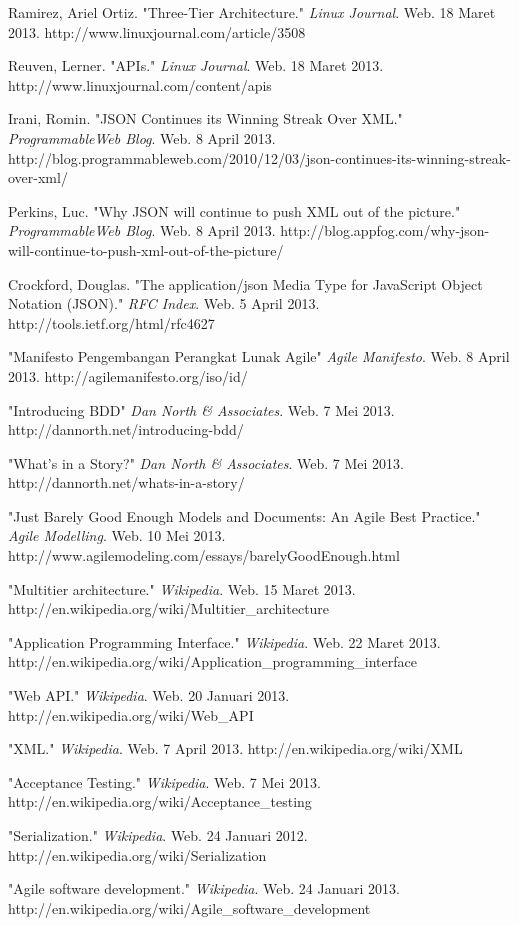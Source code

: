\documentclass{llncs}
\begin{document}
\begin{thebibliography}{1}
Ramirez, Ariel Ortiz. "Three-Tier Architecture." \emph{Linux Journal}. Web. 18 Maret 2013. http://www.linuxjournal.com/article/3508

Reuven, Lerner. "APIs." \emph{Linux Journal}. Web. 18 Maret 2013. http://www.linuxjournal.com/content/apis

Irani, Romin. "JSON Continues its Winning Streak Over XML." \emph{ProgrammableWeb Blog}. Web. 8 April 2013. http://blog.programmableweb.com/2010/12/03/json-continues-its-winning-streak-over-xml/

Perkins, Luc. "Why JSON will continue to push XML out of the picture." \emph{ProgrammableWeb Blog}. Web. 8 April 2013. http://blog.appfog.com/why-json-will-continue-to-push-xml-out-of-the-picture/

Crockford, Douglas. "The application/json Media Type for JavaScript Object Notation (JSON)." \emph{RFC Index}. Web. 5 April 2013. http://tools.ietf.org/html/rfc4627
  
  "Manifesto Pengembangan Perangkat Lunak Agile" \emph{Agile Manifesto}. Web. 8 April 2013. http://agilemanifesto.org/iso/id/
  
  "Introducing BDD" \emph{Dan North \& Associates}. Web. 7 Mei 2013. http://dannorth.net/introducing-bdd/
  
  "What's in a Story?" \emph{Dan North \& Associates}. Web. 7 Mei 2013. http://dannorth.net/whats-in-a-story/
  
  "Just Barely Good Enough Models and Documents: An Agile Best Practice." \emph{Agile Modelling}. Web. 10 Mei 2013. http://www.agilemodeling.com/essays/barelyGoodEnough.html
  
  "Multitier architecture." \emph{Wikipedia}. Web. 15 Maret 2013. http://en.wikipedia.org/wiki/Multitier\_architecture
  
  "Application Programming Interface." \emph{Wikipedia}. Web. 22 Maret 2013. http://en.wikipedia.org/wiki/Application\_programming\_interface
    
  "Web API." \emph{Wikipedia}. Web. 20 Januari 2013. http://en.wikipedia.org/wiki/Web\_API
  
  "XML." \emph{Wikipedia}. Web. 7 April 2013. http://en.wikipedia.org/wiki/XML
  
  "Acceptance Testing." \emph{Wikipedia}. Web. 7 Mei 2013. http://en.wikipedia.org/wiki/Acceptance\_testing

  "Serialization." \emph{Wikipedia}. Web. 24 Januari 2012. http://en.wikipedia.org/wiki/Serialization

  "Agile software development." \emph{Wikipedia}. Web. 24 Januari 2013. http://en.wikipedia.org/wiki/Agile\_software\_development
\end{thebibliography}
\end{document}

